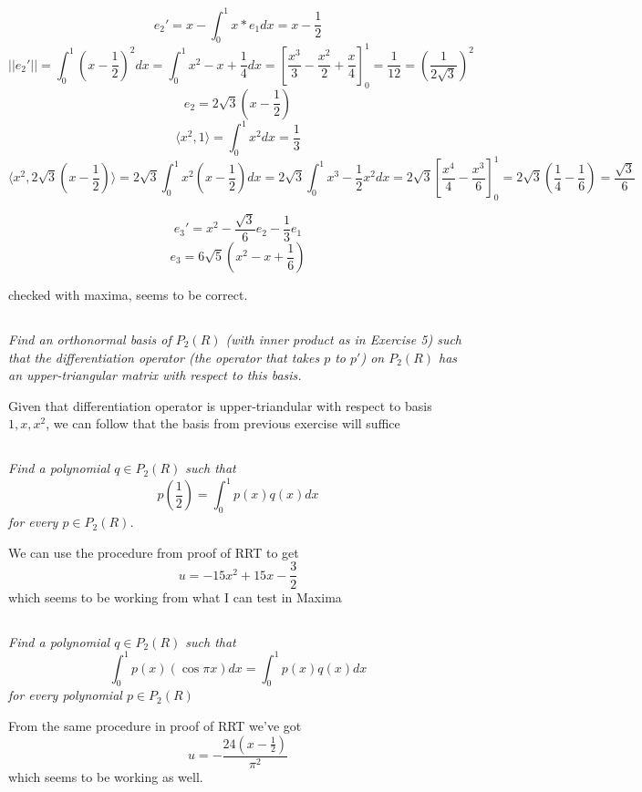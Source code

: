 \documentclass[11pt,oneside,titlepage]{book}
\newcommand{\eangle}[1]{\langle #1 \rangle}
\begin{document}
$$e_2' = x - \int_0^1{x * e_1 dx} = x - \frac 1 2$$
$$||e_2'|| = \int_0^1{(x - \frac 1 2)^2 dx} =
\int_0^1{x^2 - x + \frac 1 4 dx} = [\frac{x^3}{3} - \frac{x^2}{2} + \frac{x}{4}]_0^1 = \frac{1}{12}
= (\frac{1}{2 \sqrt{3}})^2$$
$$e_2 = 2 \sqrt{3} (x - \frac 1 2)$$
$$\eangle{x^2, 1} = \int_0^1{x^2 dx} = \frac{1}{3}$$
$$\eangle{x^2, 2 \sqrt{3} (x - \frac 1 2)} = 2 \sqrt{3} \int_0^1{x^2(x - \frac{1}{2}) dx} =
2 \sqrt{3} \int_0^1{x^3 - \frac{1}{2}x^2 dx} =
2 \sqrt{3} [\frac{x^4}{4} - \frac{x^3}{6}]_0^1 =
2 \sqrt{3} (\frac 1 4 - \frac 1 6)  = \frac{\sqrt{3}}{6} 
$$

$$e_3' = x^2 - \frac{\sqrt{3}}{6} e_2 - \frac{1}{3} e_1$$
$$e_3 = 6 \sqrt{5} (x^2 - x + \frac 1 6)$$

checked with maxima, seems to be correct.

\subsection{}

\textit{Find an orthonormal basis of $P_2(R)$ (with inner product as in Exercise 5) such that
  the differentiation operator (the operator that takes $p$ to $p'$) on $P_2(R)$ has an
  upper-triangular matrix with respect to this basis.}

Given that differentiation operator is upper-triandular with respect to basis $1, x, x^2$, we
can follow that the basis from previous exercise will suffice


\subsection{}

\textit{Find a polynomial $q \in P_2(R)$ such that }
$$p(\frac 1 2) = \int_0^1{p(x) q(x) dx}$$
\textit{for every $p \in P_2(R)$.}

We can use the procedure from proof of RRT to get
$$u = -15 x^2 + 15 x - \frac 3 2$$
which seems to be working from what I can test in Maxima


\subsection{}

\textit{Find a polynomial $q \in P_2(R)$ such that }
$$\int_0^1{p(x)(\cos \pi x) dx} = \int_0^1{p(x) q(x) dx}$$
\textit{for every polynomial $p \in P_2(R)$}

From the same procedure in proof of RRT we've got 
$$u = - \frac{24 (x - \frac 1 2)}{\pi^2}$$
which seems to be working as well.
\end{document}
